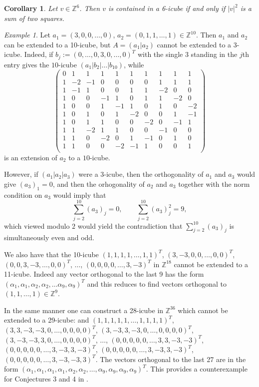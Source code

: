\documentclass[11pt]{amsart}
\newcommand{\ZZ}{\mathbb{Z}}
\newtheorem{corollary}[proposition]{Corollary}
\theoremstyle{definition}
\theoremstyle{remark}
\newtheorem{example}[proposition]{Example}
\begin{document}
\begin{corollary}\label{6Z}
Let $v\in\mathbb Z^6$. Then $v$ is contained in a 6-icube if and only if $|v|^2$ is a sum of two squares.
\end{corollary}

\begin{example}
Let $a_1=(3,0,0,\dots,0)$, $a_2=(0,1,1,\dots,1)\in \mathbb Z^{10}$. Then $a_1$ and $a_2$ can be extended to a 10-icube, but $A=(a_1|a_2)$ cannot be extended to a 3-icube. Indeed, if $b_j:=(0,\dotsc,0,3,0,\dotsc,0)^T$ with the single $3$ standing in the $j$th entry gives the $10$-icube $(a_1|b_2|\dotsc|b_{10})$, while \[\begin{pmatrix}
0 & 1 & 1 & 1 & 1 & 1 & 1 & 1 & 1 & 1 \\
1 & -2 & -1 & 0 & 0 & 0 & 0 & 1 & 1 & 1 \\
1 & -1 & 1 & 0 & 0 & 1 & 1 & -2 & 0 & 0 \\
1 & 0 & 0 & -1 & 1 & 0 & 1 & 1 & -2 & 0 \\
1 & 0 & 0 & 1 & -1 & 1 & 0 & 1 & 0 & -2 \\
1 & 0 & 1 & 0 & 1 & -2 & 0 & 0 & 1 & -1 \\
1 & 0 & 1 & 1 & 0 & 0 & -2 & 0 & -1 & 1 \\
1 & 1 & -2 & 1 & 1 & 0 & 0 & -1 & 0 & 0 \\
1 & 1 & 0 & -2 & 0 & 1 & -1 & 0 & 1 & 0 \\
1 & 1 & 0 & 0 & -2 & -1 & 1 & 0 & 0 & 1 \\
\end{pmatrix}\]
is an extension of $a_2$ to a $10$-icube.
\end{example}

However, if $(a_1|a_2|a_3)$ were a $3$-icube, then the orthogonality of $a_1$ and $a_3$ would give $(a_3)_1=0$, and then the orhogonality of $a_2$ and $a_3$ together with the norm condition on $a_3$ would imply that
\[
\sum_{j=2}^{10} (a_3)_j = 0,\qquad \sum_{j=2}^{10} (a_3)_j^2 = 9,
\]
which viewed modulo $2$ would yield the contradiction that $\sum_{j=2}^{10}(a_3)_j$ is simultaneously even and odd.

We also have that the 10-icube $(1,1,1,1,\dots,1,1)^T$, $(3,-3,0,0,\dots,0,0)^T$, $(0,0,3,-3,\dots,0,0)^T$, $\dots$, $(0,0,0,0,\dots,3,-3)^T$ in $\ZZ^{18}$ cannot be extended to a 11-icube. Indeed any vector orthogonal to the last 9 has the form $(\alpha_1,\alpha_1,\alpha_2,\alpha_2,\dots \alpha_9,\alpha_9)^T$ and this reduces to find vectors orthogonal to $(1,1,\dots,1)\in\ZZ^9$.

In the same manner one can construct a 28-icube in $\ZZ^{36}$ which cannot be extended to a 29-icube: and
$(1,1,1,1,1,\dots,1,1,1,1)^T$,
$(3,3,-3,-3,0,\dots,0,0,0,0)^T$,
$(3,-3,3,-3,0,\dots,0,0,0,0)^T$,\break
$(3,-3,-3,3,0,\dots,0,0,0,0)^T$,
$\dots$,
$(0,0,0,0,0,\dots,3,3,-3,-3)^T$,
$(0,0,0,0,0,\dots,3,-3,3,-3)^T$,\break
$(0,0,0,0,0,\dots,3,-3,3,-3)^T$,
$(0,0,0,0,0,\dots,3,-3,-3,3)^T$.
The vectors orthogonal to the last 27 are in the form $(\alpha_1,\alpha_1,\alpha_1,\alpha_1,\alpha_2,\alpha_2,\dots,\alpha_9,\alpha_9,\alpha_9,\alpha_9)^T$. This provides a counterexample for Conjectures 3 and 4 in \cite{LacalleGatti}.
\end{document}
